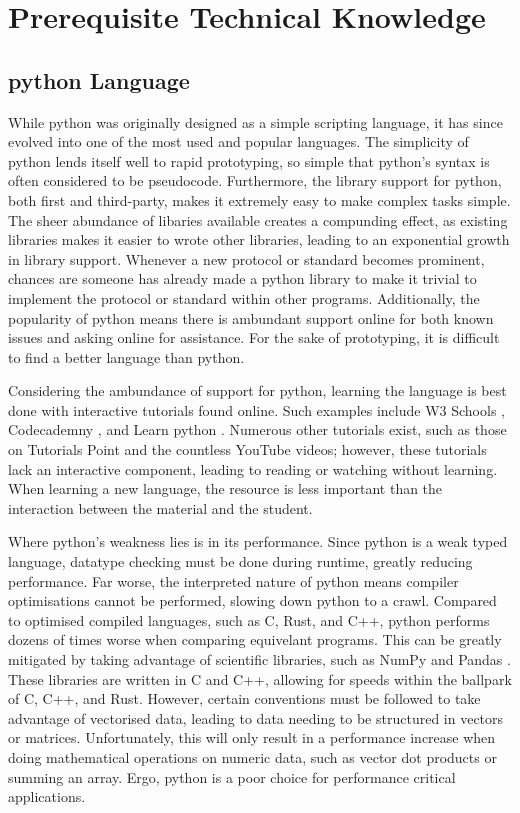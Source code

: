 \documentclass[11pt]{article}
\begin{document}
\section{Prerequisite Technical Knowledge}

\subsection{\Gls{python} Language}

While \Gls{python} was originally designed as a simple scripting language, it has since evolved into one of the most used and popular languages. The simplicity of \Gls{python} lends itself well to rapid prototyping, so simple that \Gls{python}'s syntax is often considered to be \gls{pseudocode}. Furthermore, the \gls{library} support for \Gls{python}, both first and third-party, makes it extremely easy to make complex tasks simple. The sheer abundance of libaries available creates a compunding effect, as existing libraries makes it easier to wrote other libraries, leading to an exponential growth in \gls{library} support. Whenever a new protocol or standard becomes prominent, chances are someone has already made a \Gls{python} \gls{library} to make it trivial to implement the protocol or standard within other programs. Additionally, the popularity of \Gls{python} means there is ambundant support online for both known issues and asking online for assistance. For the sake of prototyping, it is difficult to find a better language than \Gls{python}.

Considering the ambundance of support for \Gls{python}, learning the language is best done with interactive tutorials found online. Such examples include W3 Schools \cite{w3-schools-python}, Codecademny \cite{codecademy-python}, and Learn \Gls{python} \cite{learn-python}. Numerous other tutorials exist, such as those on Tutorials Point \cite{tutorialspoint-python} and the countless YouTube videos; however, these tutorials lack an interactive component, leading to reading or watching without learning. When learning a new language, the resource is less important than the interaction between the material and the student.

Where \Gls{python}'s weakness lies is in its performance. Since \Gls{python} is a weak typed language, datatype checking must be done during runtime, greatly reducing performance. Far worse, the interpreted nature of \Gls{python} means compiler optimisations cannot be performed, slowing down \Gls{python} to a crawl. Compared to optimised compiled languages, such as C, Rust, and C++, \Gls{python} performs dozens of times worse when comparing equivelant programs. This can be greatly mitigated by taking advantage of scientific libraries, such as NumPy \cite{numpy} and Pandas \cite{pandas}. These libraries are written in C and C++, allowing for speeds within the ballpark of C, C++, and Rust. However, certain conventions must be followed to take advantage of vectorised data, leading to data needing to be structured in vectors or matrices. Unfortunately, this will only result in a performance increase when doing mathematical operations on numeric data, such as vector dot products or summing an \gls{array}. Ergo, \Gls{python} is a poor choice for performance critical applications.
\end{document}
